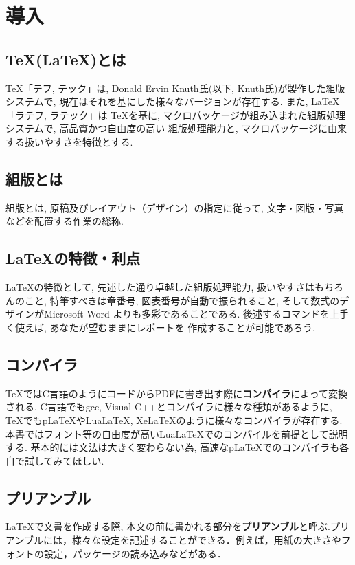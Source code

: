 \section{導入}
\subsection{\TeX(\LaTeX)とは}
\TeX 「テフ, テック」は, Donald Ervin Knuth氏(以下, Knuth氏)が製作した組版システム\cite{W3C2021}で, 
現在はそれを基にした様々なバージョンが存在する. また, \LaTeX 「ラテフ, ラテック」は
\TeX を基に, マクロパッケージが組み込まれた組版処理システムで, 高品質かつ自由度の高い
組版処理能力と, マクロパッケージに由来する扱いやすさを特徴とする. 
\subsection{組版とは}
組版とは, 原稿及びレイアウト（デザイン）の指定に従って, 文字・図版・写真などを配置する作業の総称. 
\subsection{\LaTeX の特徴・利点}
\LaTeX の特徴として, 先述した通り卓越した組版処理能力, 扱いやすさはもちろんのこと, 
特筆すべきは章番号, 図表番号が自動で振られること, そして数式のデザインがMicrosoft Word
よりも多彩であることである. 後述するコマンドを上手く使えば, あなたが望むままにレポートを
作成することが可能であろう. 
\subsection{コンパイラ}
\TeX ではC言語のようにコードからPDFに書き出す際に\textbf{コンパイラ}によって変換される. 
C言語でもgcc, Visual C++とコンパイラに様々な種類があるように, \TeX でもpLaTeXやLuaLaTeX, 
XeLaTeXのように様々なコンパイラが存在する. 
本書ではフォント等の自由度が高いLuaLaTeXでのコンパイルを前提として説明する. 
基本的には文法は大きく変わらない為, 高速なpLaTeXでのコンパイラも各自で試してみてほしい. 
\subsection{プリアンブル}
\LaTeX で文書を作成する際, 本文の前に書かれる部分を\textbf{プリアンブル}と呼ぶ.プリアンブルには，様々な設定を記述することができる．例えば，用紙の大きさやフォントの設定，パッケージの読み込みなどがある．
